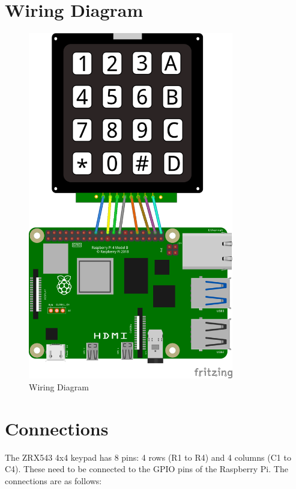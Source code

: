 \documentclass{article}
\begin{document}
	\section*{Wiring Diagram}
	\begin{figure}[H]
		\centering
		\includegraphics[width=0.8\textwidth]{09a-keypad-intro-diagram.png} %
		\caption{Wiring Diagram}
	\end{figure}
	
	\section*{Connections}
	
	The ZRX543 4x4 keypad has 8 pins: 4 rows (R1 to R4) and 4 columns (C1 to C4). These need to be connected to the GPIO pins of the Raspberry Pi. The connections are as follows:
	
\end{document}

